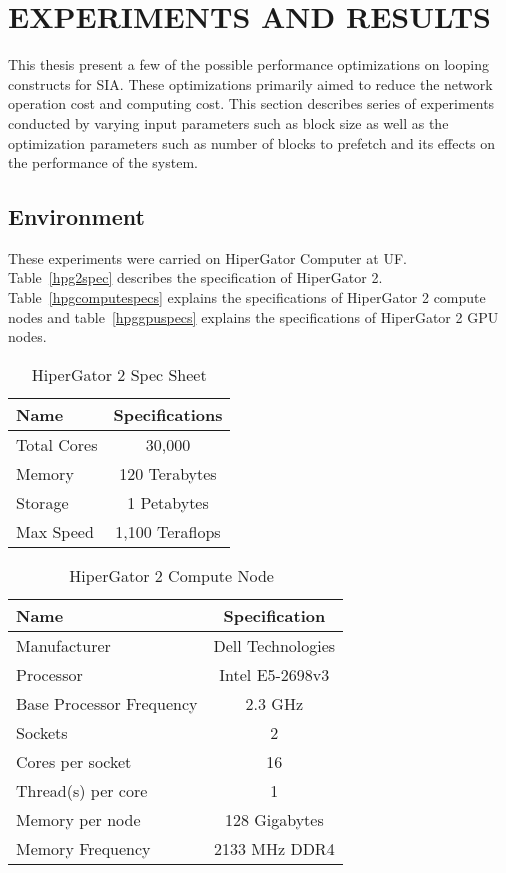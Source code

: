 \chapter{EXPERIMENTS AND RESULTS}\label{results}

This thesis present a few of the possible performance optimizations on looping
constructs for SIA. These optimizations primarily aimed to reduce the network
operation cost and computing cost. This section describes series of experiments
conducted by varying input parameters such as block size as well as the optimization
parameters such as number of blocks to prefetch and its effects on the performance
of the system.

\section{Environment}
These experiments were carried on HiperGator Computer at UF. Table~\ref{hpg2spec}
describes the specification of HiperGator 2. Table~\ref{hpgcomputespecs}
explains the specifications of HiperGator 2 compute nodes and table~\ref{hpggpuspecs}
explains the specifications of HiperGator 2 GPU nodes.
\begin{table}[h]
  \centering
  \begin{tabular}{l | c}
    Name        & Specifications  \\ \hline
    Total Cores & 30,000          \\
    Memory      & 120 Terabytes   \\
    Storage     & 1 Petabytes     \\
    Max Speed   & 1,100 Teraflops \\
  \end{tabular}
  \caption{HiperGator 2 Spec Sheet}
  \label{tab:hpg2spec}
\end{table}

\begin{table}[h]
  \begin{tabular}{l | c}
    Name                       & Specification     \\ \hline
    Manufacturer               & Dell Technologies \\
    Processor                  & Intel E5-2698v3   \\
    Base Processor Frequency   & 2.3 GHz           \\
    Sockets                    & 2                 \\
    Cores per socket           & 16                \\
    Thread(s) per core         & 1                 \\
    Memory per node            & 128 Gigabytes     \\
    Memory Frequency           & 2133 MHz DDR4     \\
  \end{tabular}
  \caption{HiperGator 2 Compute Node~\cite{hpg2-spec-sheet}\cite{intel-compute-cpu-spec}}
  \label{tab:hpgcomputespecs}
\end{table}

